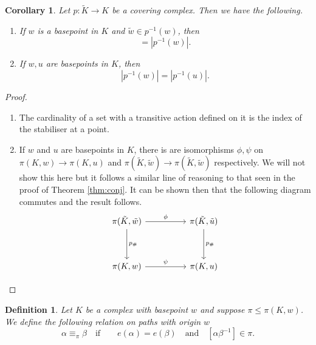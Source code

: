 \documentclass[12pt]{article}
\newtheorem{definition}{Definition}
\newtheorem{corollary}{Corollary}[theorem]
\theoremstyle{definition}
\numberwithin{equation}{theorem}
\begin{document}
\begin{corollary}
  Let $p: \tilde{K} \rightarrow K$ be a covering complex. Then we have the following.
  \begin{enumerate}
  \item If $w$ is a basepoint in $K$ and $\tilde{w} \in p^{-1}(w)$, then
    \begin{equation*}
      [\pi(K,w) : p_{\#}\pi(\tilde{K},\tilde{w})] = |p^{-1}(w)|.
    \end{equation*}
  \item If $w,u$ are basepoints in $K$, then
    \begin{equation*}
      |p^{-1}(w)| = |p^{-1}(u)|.
    \end{equation*}
  \end{enumerate}
\end{corollary}

\begin{proof}
  \begin{enumerate}
  \item The cardinality of a set with a transitive action defined on it is the index of the stabiliser at a point.
  \item If $w$ and $u$ are basepoints in $K$, there is are isomorphisms $\phi,\psi$ on $\pi(K,w)\rightarrow\pi(K,u)$ and $\pi(\tilde{K},\tilde{w})\rightarrow\pi(\tilde{K},\tilde{w})$ respectively. We will not show this here but it follows a similar line of reasoning to that seen in the proof of Theorem \ref{thm:conj}. It can be shown then that the following diagram commutes and the result follows.
    \begin{equation*}
      \begin{tikzcd}[ampersand replacement=\&, sep=huge]
        \pi(\tilde{K},\tilde{w})\arrow[r,"\phi"]\arrow[d,"p_{\#}"]\& \pi(\tilde{K},\tilde{u}) \arrow[d,"p_{\#}"] \\
        \pi(K,w) \arrow[r,"\psi"] \& \pi(K,u)
      \end{tikzcd}
    \end{equation*}
  \end{enumerate}
\end{proof}

\begin{definition}
  Let $K$ be a complex with basepoint $w$ and suppose $\pi \leq \pi(K,w)$. We define the following relation on paths with origin $w$
  \begin{equation*}
    \alpha \equiv_\pi \beta \quad\text{if}\qquad e(\alpha) = e(\beta) \quad\text{and}\quad [\alpha\beta^{-1}] \in \pi.
  \end{equation*}
\end{definition}
\end{document}
